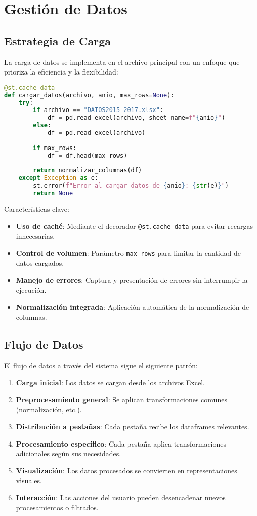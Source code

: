 \section{Gestión de Datos}

\subsection{Estrategia de Carga}
La carga de datos se implementa en el archivo principal con un enfoque que prioriza la eficiencia y la flexibilidad:

\begin{lstlisting}[language=Python, caption=Implementación de carga de datos]
@st.cache_data
def cargar_datos(archivo, anio, max_rows=None):
    try:
        if archivo == "DATOS2015-2017.xlsx":
            df = pd.read_excel(archivo, sheet_name=f"{anio}")
        else:
            df = pd.read_excel(archivo)
        
        if max_rows:
            df = df.head(max_rows)
            
        return normalizar_columnas(df)
    except Exception as e:
        st.error(f"Error al cargar datos de {anio}: {str(e)}")
        return None
\end{lstlisting}

Características clave:
\begin{itemize}
    \item \textbf{Uso de caché}: Mediante el decorador \texttt{@st.cache\_data} para evitar recargas innecesarias.
    \item \textbf{Control de volumen}: Parámetro \texttt{max\_rows} para limitar la cantidad de datos cargados.
    \item \textbf{Manejo de errores}: Captura y presentación de errores sin interrumpir la ejecución.
    \item \textbf{Normalización integrada}: Aplicación automática de la normalización de columnas.
\end{itemize}

\subsection{Flujo de Datos}
El flujo de datos a través del sistema sigue el siguiente patrón:

\begin{enumerate}
    \item \textbf{Carga inicial}: Los datos se cargan desde los archivos Excel.
    \item \textbf{Preprocesamiento general}: Se aplican transformaciones comunes (normalización, etc.).
    \item \textbf{Distribución a pestañas}: Cada pestaña recibe los dataframes relevantes.
    \item \textbf{Procesamiento específico}: Cada pestaña aplica transformaciones adicionales según sus necesidades.
    \item \textbf{Visualización}: Los datos procesados se convierten en representaciones visuales.
    \item \textbf{Interacción}: Las acciones del usuario pueden desencadenar nuevos procesamientos o filtrados.
\end{enumerate}

